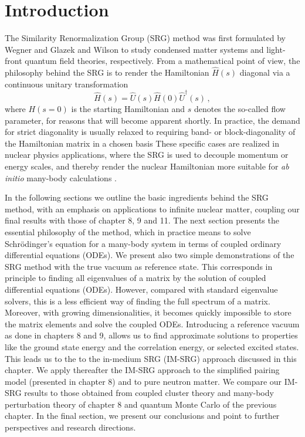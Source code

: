 \section{Introduction}

The Similarity Renormalization Group (SRG) method was first formulated by
Wegner \cite{wegner1994} and Glazek and Wilson \cite{glazek1993}
to study condensed matter systems and light-front quantum field
theories, respectively.  From a mathematical point of view, the
philosophy behind the SRG is to render the Hamiltonian $\hat{H}(s)$
diagonal via a continuous unitary transformation
\begin{equation}\label{eq:cut}
  \hat{H}(s)=\hat{U}(s)\hat{H}(0)\hat{U}^{\dagger}(s)\,,
\end{equation}
where $H(s=0)$ is the starting Hamiltonian and $s$ denotes the so-called flow
parameter, for reasons that will become apparent shortly. In practice, the demand 
for strict diagonality is usually relaxed to requiring band- or block-diagonality 
of the Hamiltonian matrix in a chosen basis
These specific cases are realized in nuclear
physics applications, where the SRG is used to decouple momentum or
energy scales, and thereby render the nuclear Hamiltonian more
suitable for \emph{ab initio} many-body calculations \cite{bogner2007,bogner2010,morris2015,bogner2016}.

In the following sections we outline the basic ingredients behind the
SRG method, with an emphasis on applications to infinite nuclear
matter, coupling our final results with those of chapter 8, 9 and
11. The next section presents the essential philosophy of the method,
which in practice means to solve Schr\"odinger's equation for a
many-body system in terms of coupled ordinary differential equations
(ODEs). We present also two simple demonstrations of the SRG method with the true vacuum as reference state. This corresponds in principle to finding all eigenvalues of a matrix by the solution of coupled differential equations (ODEs). 
However, compared with standard eigenvalue solvers, this is a less efficient way of finding the full spectrum of a matrix. 
Moreover, with growing dimensionalities, it becomes quickly impossible to store the matrix elements and solve the coupled ODEs. 
Introducing a reference vacuum as done in chapters 8 and 9, allows us to find approximate solutions to properties  like the  ground state energy and the correlation energy, or selected excited states. This leads us to the
to the in-medium SRG (IM-SRG) approach discussed in this chapter. 
We apply thereafter the IM-SRG approach to the simplified pairing  model (presented in chapter 8) and 
to pure neutron matter. We compare our IM-SRG results to those obtained from coupled cluster theory and many-body perturbation theory of  chapter 8 and quantum Monte Carlo of the previous chapter.  In the final section, we present our conclusions and point  to further
perspectives and research directions.

